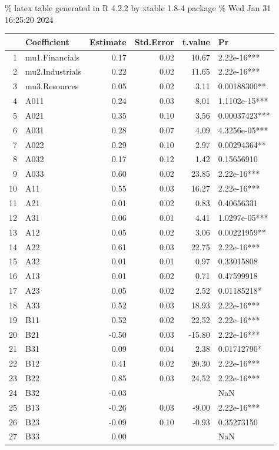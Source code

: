 \documentclass[11pt,preprint, authoryear]{elsarticle}
\let\origtable\table
\let\endorigtable\endtable
\renewenvironment{table}[1][2] {
    \expandafter\origtable\expandafter[H]
} {
    \endorigtable
}
\numberwithin{equation}{section}
\numberwithin{figure}{section}
\numberwithin{table}{section}
\begin{document}
\% latex table generated in R 4.2.2 by xtable 1.8-4 package \% Wed Jan
31 16:25:20 2024

\begin{table}[ht]
\centering
\begin{tabular}{rlrrrl}
  \hline
 & Coefficient & Estimate & Std.Error & t.value & Pr \\ 
  \hline
1 & mu1.Financials & 0.17 & 0.02 & 10.67 & 2.22e-16*** \\ 
  2 & mu2.Industrials & 0.22 & 0.02 & 11.65 & 2.22e-16*** \\ 
  3 & mu3.Resources & 0.05 & 0.02 & 3.11 & 0.00188300** \\ 
  4 & A011 & 0.24 & 0.03 & 8.01 & 1.1102e-15*** \\ 
  5 & A021 & 0.35 & 0.10 & 3.56 & 0.00037423*** \\ 
  6 & A031 & 0.28 & 0.07 & 4.09 & 4.3256e-05*** \\ 
  7 & A022 & 0.29 & 0.10 & 2.97 & 0.00294364** \\ 
  8 & A032 & 0.17 & 0.12 & 1.42 & 0.15656910 \\ 
  9 & A033 & 0.60 & 0.02 & 23.85 & 2.22e-16*** \\ 
  10 & A11 & 0.55 & 0.03 & 16.27 & 2.22e-16*** \\ 
  11 & A21 & 0.01 & 0.02 & 0.83 & 0.40656331 \\ 
  12 & A31 & 0.06 & 0.01 & 4.41 & 1.0297e-05*** \\ 
  13 & A12 & 0.05 & 0.02 & 3.06 & 0.00221959** \\ 
  14 & A22 & 0.61 & 0.03 & 22.75 & 2.22e-16*** \\ 
  15 & A32 & 0.01 & 0.01 & 0.97 & 0.33015808 \\ 
  16 & A13 & 0.01 & 0.02 & 0.71 & 0.47599918 \\ 
  17 & A23 & 0.05 & 0.02 & 2.52 & 0.01185218* \\ 
  18 & A33 & 0.52 & 0.03 & 18.93 & 2.22e-16*** \\ 
  19 & B11 & 0.52 & 0.02 & 22.52 & 2.22e-16*** \\ 
  20 & B21 & -0.50 & 0.03 & -15.80 & 2.22e-16*** \\ 
  21 & B31 & 0.09 & 0.04 & 2.38 & 0.01712790* \\ 
  22 & B12 & 0.41 & 0.02 & 20.30 & 2.22e-16*** \\ 
  23 & B22 & 0.85 & 0.03 & 24.52 & 2.22e-16*** \\ 
  24 & B32 & -0.03 &  &  & NaN \\ 
  25 & B13 & -0.26 & 0.03 & -9.00 & 2.22e-16*** \\ 
  26 & B23 & -0.09 & 0.10 & -0.93 & 0.35273150 \\ 
  27 & B33 & 0.00 &  &  & NaN \\ 
   \hline
\end{tabular}
\caption{BEKK11 Model (restricted data)} 
\label{tab:bekk11}
\end{table}
\end{document}
